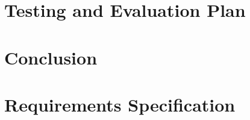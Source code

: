 \documentclass[ms,twoside,print]{nuthesis}
\begin{document}
\chapter{Testing and Evaluation Plan}

\chapter{Conclusion}

\appendix
\chapter{Requirements Specification}

\backmatter



\end{document}
